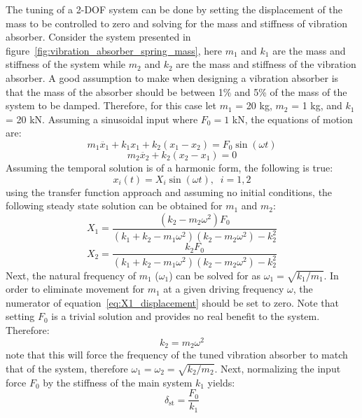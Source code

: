 \documentclass[12pt,letter]{article}
\numberwithin{ex}{section} %
\numberwithin{re}{section} %
\begin{document}
The tuning of a 2-DOF system can be done by setting the displacement of the mass to be controlled to zero and solving for the mass and stiffness of vibration absorber. Consider the system presented in figure~\ref{fig:vibration_absorber_spring_mass}, here $m_1$ and $k_1$ are the mass and stiffness of the system while $m_2$ and $k_2$ are the mass and stiffness of the vibration absorber. A good assumption to make when designing a vibration absorber is that the mass of the absorber should be between 1\% and 5\% of the mass of the system to be damped. Therefore, for this case let $m_1$ = 20 kg, $m_2$ = 1 kg, and $k_1$ = 20 kN. Assuming a sinusoidal input where $F_0 = 1$ kN, the equations of motion are:
\begin{equation}
m_1\ddot{x_1} + k_1 x_1 + k_2(x_1-x_2)  = F_0 \sin (\omega t)
\end{equation}
\begin{equation}
m_2\ddot{x_2} + k_2(x_2-x_1) = 0
\end{equation}
Assuming the temporal solution is of a harmonic form, the following is true:
\begin{equation}
x_i(t) = X_i \sin (\omega t ), \; \; i=1,2
\end{equation}
using the transfer function approach and assuming no initial conditions, the following steady state solution can be obtained for $m_1$ and $m_2$:
\begin{equation}
X_1 = \frac{(k_2 - m_2 \omega^2)F_0}{(k_1+k_2-m_1 \omega^2)(k_2-m_2 \omega^2) -k_2^2}
\label{eq:X1_displacement}
\end{equation}
\begin{equation}
X_2 = \frac{k_2 F_0}{(k_1+k_2-m_1 \omega^2)(k_2-m_2 \omega^2) -k_2^2}
\label{eq:X2_displacement}
\end{equation}
Next, the natural frequency of $m_1$ ($\omega_1$) can be solved for as $\omega_1=\sqrt{k_1 / m_1}$. In order to eliminate movement for $m_1$ at a given driving frequency $\omega$, the numerator of equation~\ref{eq:X1_displacement} should be set to zero. Note that setting $F_0$ is a trivial solution and provides no real benefit to the system. Therefore:
\begin{equation}
k_2 = m_2 \omega^2
\end{equation}
note that this will force the frequency of the tuned vibration absorber to match that of the system, therefore $\omega_1 = \omega_2 = \sqrt{k_2 / m_2}$. Next, normalizing the input force $F_0$ by the stiffness of the main system $k_1$ yields:
\begin{equation}
\delta_{\text{st}} = \frac{F_0}{k_1}
\end{equation}
\end{document}
